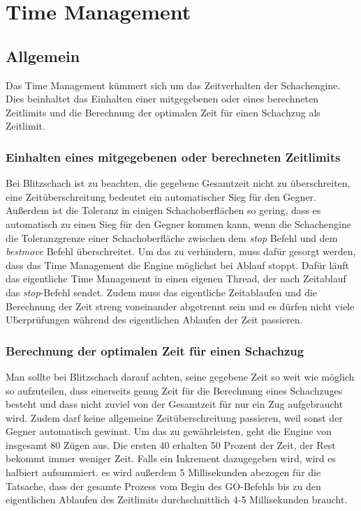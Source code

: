 \def \citeGameMode[#1]{\cite[#1]{gameMode}}
\section{Time Management}\label{sec:timeMan}
\subsection{Allgemein}
Das Time Management kümmert sich um das Zeitverhalten der Schachengine. Dies beinhaltet
das Einhalten einer mitgegebenen oder eines berechneten Zeitlimits und die Berechnung der optimalen Zeit für einen Schachzug als Zeitlimit.

\subsubsection{Einhalten eines mitgegebenen oder berechneten Zeitlimits}
Bei Blitzschach ist zu beachten, die gegebene Gesamtzeit nicht zu überschreiten, eine Zeitüberschreitung bedeutet ein automatischer Sieg für den Gegner.\newline
Außerdem ist die Toleranz in einigen Schachoberfl\"achen so gering, dass es automatisch zu einen Sieg f\"ur den Gegner kommen kann, wenn die Schachengine die Toleranzgrenze einer Schachoberfl\"ache zwischen dem \textit{stop} Befehl und dem \textit{bestmove} Befehl \"uberschreitet. \cite[0]{tctolerance}
\newline Um das zu verhindern, muss dafür gesorgt werden, dass das Time Management die Engine möglichst bei Ablauf stoppt. Dafür läuft das eigentliche Time Management in einen eigenen Thread, der nach Zeitablauf das \textit{stop}-Befehl sendet. Zudem muss das eigentliche Zeitablaufen und die Berechnung der Zeit streng voneinander abgetrennt sein und es d\"urfen nicht viele U\"berpr\"ufungen  w\"ahrend des eigentlichen Ablaufen der Zeit passieren.

\subsubsection{Berechnung der optimalen Zeit für einen Schachzug}
Man sollte bei Blitzschach darauf achten, seine gegebene Zeit so weit wie möglich so aufzuteilen, dass einerseits genug Zeit für die Berechnung eines Schachzuges besteht und dass nicht zuviel von der Gesamtzeit für nur ein Zug aufgebraucht wird. Zudem darf keine allgemeine Zeitüberschreitung passieren, weil sonst der Gegner automatisch gewinnt. 
\newline Um das zu gewährleisten, geht die Engine von insgesamt 80 Zügen aus. Die ersten 40 erhalten 50 Prozent der Zeit, der Rest bekommt immer weniger Zeit. Falls ein Inkrement dazugegeben wird, wird es halbiert aufsummiert. 
\newline es wird außerdem 5 Millisekunden abezogen f\"ur die Tatsache, dass der gesamte Prozess vom Begin des GO-Befehls bis zu den eigentlichen Ablaufen des Zeitlimits durchschnittlich 4-5 Millisekunden braucht.

